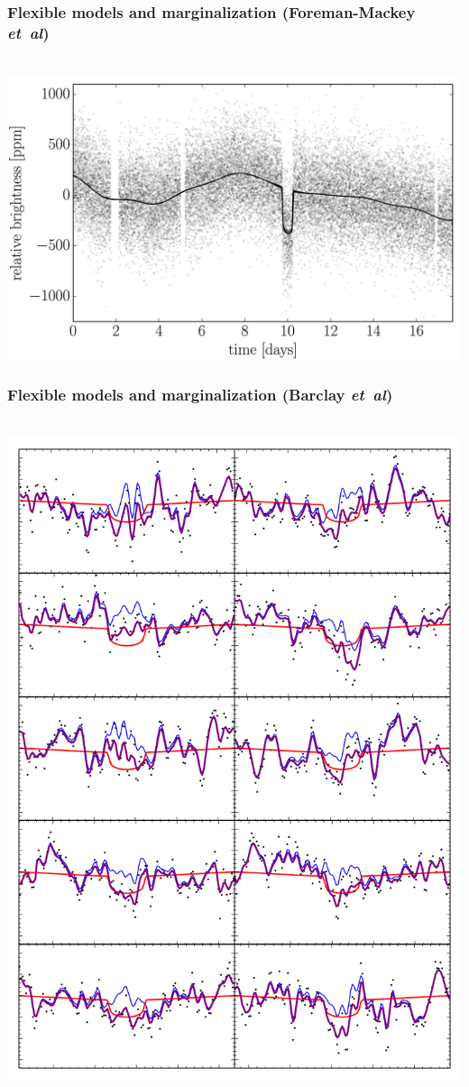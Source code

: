 \documentclass[aspectratio=169]{beamer}
\newcommand{\foreign}[1]{\textsl{#1}}
\newcommand{\etal}{\foreign{et~al}}
\begin{document}
\begin{frame}
  \frametitle{Flexible models and marginalization \small{(Foreman-Mackey \etal)}}
  ~\hfill\includegraphics[height=0.85\textheight]{kepler-prediction.png}
\end{frame}

\begin{frame}
  \frametitle{Flexible models and marginalization \small{(Barclay \etal)}}
  ~\hfill\includegraphics[height=0.85\textheight]{ten_transits.png}
\end{frame}
\end{document}
